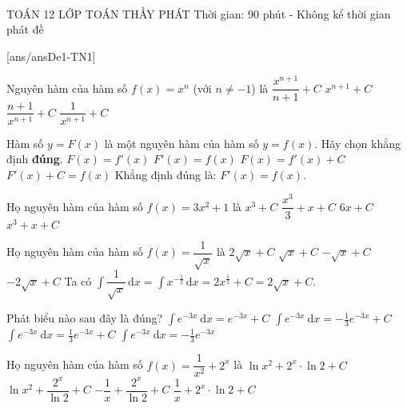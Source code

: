 ﻿﻿\begin{name}
	{\tenchude}
	{TOÁN 12}
	{LỚP TOÁN THẦY PHÁT}
	{Thời gian: 90 phút - Không kể thời gian phát đề}
\end{name}
\TN
{}[ans/ansDe1-TN1]
\begin{ex}%
	Nguyên hàm của hàm số $f(x)=x^n$ (với $n\neq -1$) là
	\choice
	{\True $\dfrac{x^{n+1}}{n+1}+C$}
	{$x^{n+1}+C$}
	{$\dfrac{n+1}{x^{n+1}}+C$}
	{$\dfrac{1}{x^{n+1}}+C$}
\end{ex}

\begin{ex}%
	Hàm số $y=F(x)$ là một nguyên hàm của hàm số $y=f(x)$. Hãy chọn khẳng định \textbf{đúng}.
	\choice
	{$F(x)=f'(x)$}
	{\True $F'(x)=f(x)$}
	{$F(x)=f'(x)+C$}
	{$F'(x)+C=f(x)$}
	\loigiai
	{
		Khẳng định đúng là: $F'(x)=f(x)$.
	}
\end{ex}

\begin{ex}%
	Họ nguyên hàm của hàm số $f(x)=3x^2+1$ là
	\choice
	{$x^3+C$}
	{$\dfrac{x^3}{3}+x+C$}
	{$6x+C$}
	{\True $x^3+x+C$}
\end{ex}

\begin{ex}%
	Họ nguyên hàm của hàm số $f(x)= \dfrac{1}{\sqrt{x}} $ là
	\choice
	{\True $2\sqrt{x}+C$}
	{$\sqrt{x} + C$}
	{$- \sqrt{x} +C$}
	{$-2\sqrt{x}+C$}
	\loigiai
	{
	Ta có $\displaystyle \int\dfrac{1}{\sqrt{x}}\mathrm{\,d}x=\int x^{-\tfrac{1}{2}}\mathrm{\,d}x=2x^{\tfrac{1}{2}}+C=2\sqrt{x}+C$.
	}
\end{ex}

\begin{ex}%
	Phát biểu nào sau đây là đúng?
	\choice
	{$\displaystyle\int e^{-3 x} \mathrm{~d} x=e^{-3 x}+C$}
	{\True $\displaystyle\int e^{-3 x} \mathrm{~d} x=-\frac{1}{3} e^{-3 x}+C$}
	{$\displaystyle\int e^{-3 x} \mathrm{~d} x=\frac{1}{3} e^{-3 x}+C$}
	{$\displaystyle\int e^{-3 x} \mathrm{~d} x=-\frac{1}{3} e^{-3 x}$}
\end{ex}

\begin{ex}%
	Họ nguyên hàm của hàm số $f(x)=\dfrac{1}{x^2}+2^x$ là
	\choice
	{$\ln x^2+2^x \cdot \ln 2+C$}
	{$\ln x^2+\dfrac{2^x}{\ln 2}+C$}
	{\True $-\dfrac{1}{x}+\dfrac{2^x}{\ln 2}+C$}
	{$\dfrac{1}{x}+2^x \cdot \ln 2+C$}
\end{ex}

